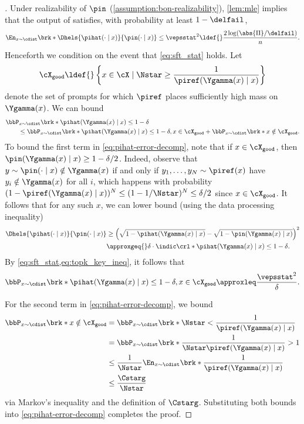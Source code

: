 \begin{proof}[]%
  \newcommand{\cXgood}{\cX_{\texttt{good}}}%
  \newcommand{\pik}{\pi_k}%
  \newcommand{\kstar}{k_{\star}}%
Under realizability of $\pin$ (\cref{assumption:bon-realizability}),
\cref{lem:mle} implies that the output of \bestofnalg satisfies, with probability at least $1-\delfail$,
\begin{align}
  \label{eq:sft_stat}
  \En_{x\sim\cdist}\brk*{\Dhels{\pihat(\cdot\mid{}x)}{\pin(\cdot\mid{}x)}}\leq\vepsstat^2\ldef{}\frac{2\log(\abs{\Pi}/\delfail)}{n}.
\end{align}  
Henceforth we condition on the event that \cref{eq:sft_stat} holds. Let
\[
  \cXgood\ldef{}\left\{
    x\in\cX\mid\Nstar\geq\frac{1}{\piref(\Ygamma(x)\mid{}x)}
    \right\}
  \]
  denote the set of prompts for which $\piref$ places sufficiently
  high mass on $\Ygamma(x)$.
  We can bound
  \begin{align}
    &\bbP_{x\sim\cdist}\brk*{\pihat(\Ygamma(x)\mid{}x)\leq{}1-\delta}
    \\ 
    &\qquad\leq{}
    \bbP_{x\sim\cdist}\brk*{\pihat(\Ygamma(x)\mid{}x)\leq{}1-\delta,
    x\in\cXgood}
    +     \bbP_{x\sim\cdist}\brk*{x\notin\cXgood}.\label{eq:pihat-error-decomp}
  \end{align}
  To bound the first term in \cref{eq:pihat-error-decomp}, note that if $x\in\cXgood$, then
  $\pin(\Ygamma(x)\mid{}x)\geq{}1-\delta/2$. Indeed, observe that
  $y\sim\pin(\cdot\mid{}x)\notin\Ygamma(x)$ if and only if
  $y_1,\ldots,y_N\sim\piref(x)$ have $y_i\notin\Ygamma(x)$ for all
  $i$, which happens with probability
  $(1-\piref(\Ygamma(x)\mid{}x))^N \leq (1-1/\Nstar)^N \leq \delta/2$ since $x \in \cXgood$. It follows that for any such $x$, we can lower bound (using the data processing inequality)
  \begin{align}
    \Dhels{\pihat(\cdot\mid{}x)}{\pin(\cdot\mid{}x)}
    &\geq \left(\sqrt{1-\pihat(\Ygamma(x)\mid{}x)} - \sqrt{1-\pin(\Ygamma(x)\mid{}x)}\right)^2 \\
    &\approxgeq{} \delta\cdot\indic\crl*{\pihat(\Ygamma(x)\mid{}x)\leq{}1-\delta}. \label{eq:topk_key_ineq}
  \end{align}
  By \cref{eq:sft_stat,eq:topk_key_ineq}, it follows that
  \[
    \bbP_{x\sim\cdist}\brk*{\pihat(\Ygamma(x)\mid{}x)\leq{}1-\delta,
      x\in\cXgood}\approxleq \frac{\vepsstat^2}{\delta}.
  \]

  For the second term in \cref{eq:pihat-error-decomp}, we bound
  \begin{align}
    \bbP_{x\sim\cdist}\brk*{x\notin\cXgood}
    &=
    \bbP_{x\sim\cdist}\brk*{\Nstar < \frac{1}{\piref(\Ygamma(x)\mid{}x)}} \\
    &=
    \bbP_{x\sim\cdist}\brk*{\frac{1}{\Nstar\piref(\Ygamma(x)\mid{}x)}> 1} \\
    &\leq{}
    \frac{1}{\Nstar}\En_{x\sim\cdist}\brk*{\frac{1}{\piref(\Ygamma(x)\mid{}x)}} \\
    &\leq{}  \frac{\Cstarg}{\Nstar}
  \end{align}
  via Markov's inequality and the definition of $\Cstarg$. Substituting both bounds into \cref{eq:pihat-error-decomp} completes the proof.
\end{proof}



